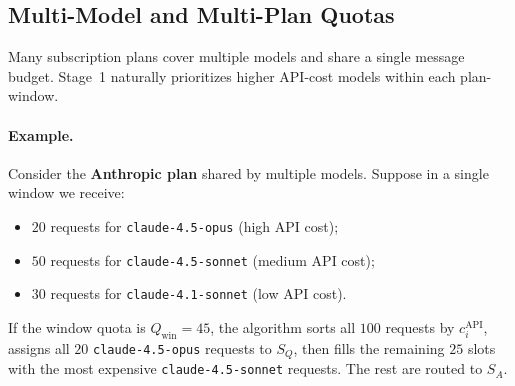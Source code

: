 \documentclass[11pt]{article}
\begin{document}
\subsection{Multi-Model and Multi-Plan Quotas}
Many subscription plans cover multiple models and share a single message budget. Stage~1 naturally prioritizes higher API-cost models within each plan-window.

\paragraph{Example.}
Consider the \textbf{Anthropic plan} shared by multiple models. Suppose in a single window we receive:
\begin{itemize}
  \item \(20\) requests for \texttt{claude-4.5-opus} (high API cost);
  \item \(50\) requests for \texttt{claude-4.5-sonnet} (medium API cost);
  \item \(30\) requests for \texttt{claude-4.1-sonnet} (low API cost).
\end{itemize}
If the window quota is \(Q_{\text{win}} = 45\), the algorithm sorts all \(100\) requests by \(c_i^{\text{API}}\), assigns all \(20\) \texttt{claude-4.5-opus} requests to \(S_Q\), then fills the remaining \(25\) slots with the most expensive \texttt{claude-4.5-sonnet} requests. The rest are routed to \(S_A\).
\end{document}
